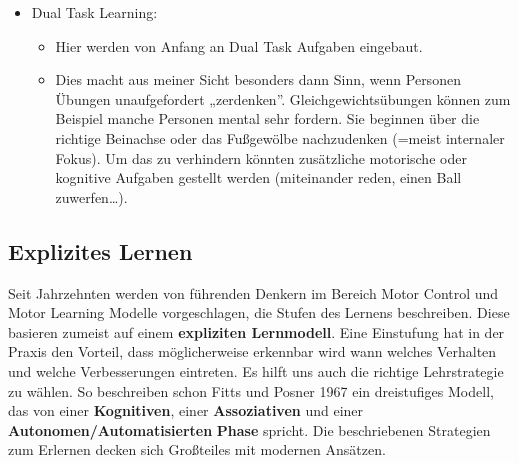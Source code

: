 \documentclass[
  letterpaper,
  DIV=11,
  numbers=noendperiod]{scrreprt}
\providecommand{\tightlist}{%
  \setlength{\itemsep}{0pt}\setlength{\parskip}{0pt}}
\begin{document}
\begin{itemize}
  \begin{itemize}
  \tightlist
  \item
    Dieser Punkt wird von Masters unter implizites Lernen gesetzt.
    Gabriele Wulf, die viele der Studien durchgeführt hat, beschränkt
    sich jedoch nicht auf diese Einteilung.
  \item
    Unabhängig davon wurden viele Studien zu externalem Fokus
    durchgeführt und die Ergebnisse scheinen recht konsistent.
    Externaler Fokus ist für das Lernen fast immer besser als
    internaler!
  \item
    Es wird dabei nicht der Fokus auf den Körper oder die Bewegungen des
    Körpers gelenkt, sondern auf äußere Effekte der Bewegung oder auf
    Instrumente.
  \item
    Z.B. Langhantel Press: Internal = „Streck die Arme''; „Spann den
    Trizeps'', External = „Drück die Hantel zur Decke''
  \end{itemize}
\item
  Dual Task Learning:

  \begin{itemize}
  \tightlist
  \item
    Hier werden von Anfang an Dual Task Aufgaben eingebaut.
  \item
    Dies macht aus meiner Sicht besonders dann Sinn, wenn Personen
    Übungen unaufgefordert „zerdenken''. Gleichgewichtsübungen können
    zum Beispiel manche Personen mental sehr fordern. Sie beginnen über
    die richtige Beinachse oder das Fußgewölbe nachzudenken (=meist
    internaler Fokus). Um das zu verhindern könnten zusätzliche
    motorische oder kognitive Aufgaben gestellt werden (miteinander
    reden, einen Ball zuwerfen\ldots).
  \end{itemize}
\end{itemize}

\subsection{Explizites Lernen}\label{explizites-lernen}

Seit Jahrzehnten werden von führenden Denkern im Bereich Motor Control
und Motor Learning Modelle vorgeschlagen, die Stufen des Lernens
beschreiben. Diese basieren zumeist auf einem \textbf{expliziten
Lernmodell}. Eine Einstufung hat in der Praxis den Vorteil, dass
möglicherweise erkennbar wird wann welches Verhalten und welche
Verbesserungen eintreten. Es hilft uns auch die richtige Lehrstrategie
zu wählen. So beschreiben schon Fitts und Posner 1967 ein dreistufiges
Modell, das von einer \textbf{Kognitiven}, einer \textbf{Assoziativen}
und einer \textbf{Autonomen/Automatisierten} \textbf{Phase} spricht. Die
beschriebenen Strategien zum Erlernen decken sich Großteiles mit
modernen Ansätzen.
\end{document}
